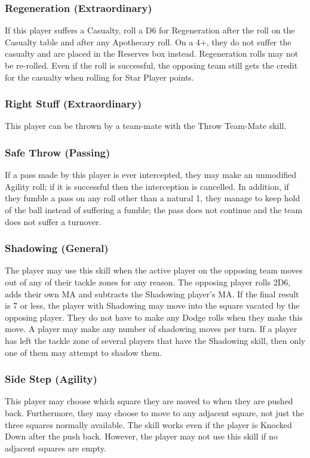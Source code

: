 \documentclass{article}
\begin{document}
\begin{multicols}{3}
\subsubsection{Regeneration (Extraordinary)}
\par If this player suffers a Casualty, roll a D6 for Regeneration after the roll on the Casualty table and after any Apothecary roll. On a 4+, they do not suffer the casualty and are placed in the Reserves box instead. Regeneration rolls may not be re-rolled. Even if the roll is successful, the opposing team still gets the credit for the casualty when rolling for Star Player points.

\subsubsection{Right Stuff (Extraordinary)}
\par This player can be thrown by a team-mate with the Throw Team-Mate skill.

\subsubsection{Safe Throw (Passing)}
\par If a pass made by this player is ever intercepted, they may make an unmodified Agility roll; if it is successful then the interception is cancelled. In addition, if they fumble a pass on any roll other than a natural 1, they manage to keep hold of the ball instead of suffering a fumble; the pass does not continue and the team does not suffer a turnover.

\subsubsection{Shadowing (General)}
\par The player may use this skill when the active player on the opposing team moves out of any of their tackle zones for any reason. The opposing player rolls 2D6, adds their own MA and subtracts the Shadowing player's MA. If the final result is 7 or less, the player with Shadowing may move into the square vacated by the opposing player. They do not have to make any Dodge rolls when they make this move. A player may make any number of shadowing moves per turn. If a player has left the tackle zone of several players that have the Shadowing skill, then only one of them may attempt to shadow them.

\subsubsection{Side Step (Agility)}
\par This player may choose which square they are moved to when they are pushed back. Furthermore, they may choose to move to any adjacent square, not just the three squares normally available. The skill works even if the player is Knocked Down after the push back. However, the player may not use this skill if no adjacent squares are empty.


\end{multicols}
\end{document}

